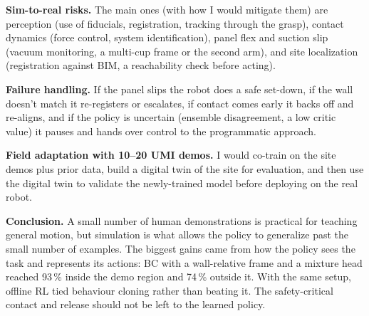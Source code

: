 \documentclass[10pt]{article}
\newcommand{\pct}{\,\%}
\newcommand{\para}[1]{\textbf{#1}}
\begin{document}
\para{Sim-to-real risks.} The main ones (with how I would mitigate them) are perception (use of fiducials,
registration, tracking through the grasp), contact dynamics (force control, system identification), panel
flex and suction slip (vacuum monitoring, a multi-cup frame or the second arm), and site localization
(registration against BIM, a reachability check before acting).

\para{Failure handling.} If the panel slips the robot does a safe set-down, if the wall doesn't match it
re-registers or escalates, if contact comes early it backs off and re-aligns, and if the policy is uncertain
(ensemble disagreement, a low critic value) it pauses and hands over control to the programmatic approach.

\para{Field adaptation with 10--20 UMI demos.} I would co-train on the site demos plus prior data, build a
digital twin of the site for evaluation, and then use the digital twin to validate the newly-trained model before deploying on the real robot.

\para{Conclusion.} A small number of human demonstrations is practical for teaching general motion, but simulation is what allows the policy to generalize past the small number of examples. The biggest gains came from how the policy sees the task and represents its actions: BC with a wall-relative frame and a mixture head reached 93\pct{} inside the demo region and 74\pct{} outside it. With the same setup, offline RL tied behaviour cloning rather than beating it. The safety-critical contact and release should not be left to the learned policy.
\end{document}
